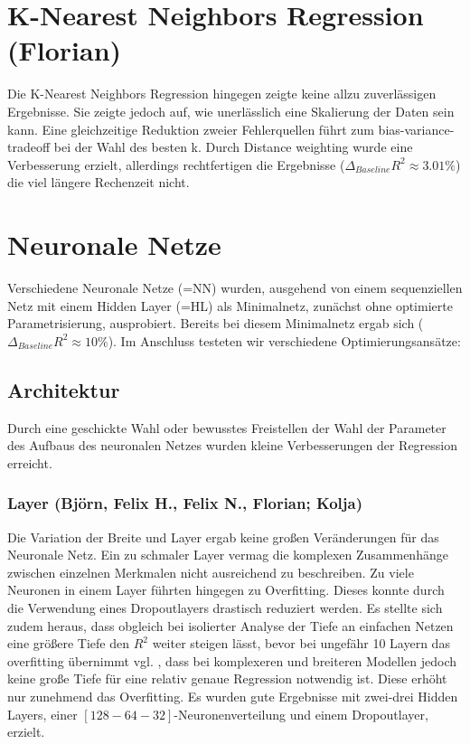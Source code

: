 \documentclass[9pt,a4paper,twocolumn,twoside]{tau-class/tau}
\begin{document}
\section{K-Nearest Neighbors Regression (Florian)}
        Die K-Nearest Neighbors Regression hingegen zeigte keine allzu zuverlässigen Ergebnisse. Sie zeigte jedoch auf,
        wie unerlässlich eine Skalierung der Daten sein kann. Eine gleichzeitige Reduktion zweier Fehlerquellen führt zum bias-variance-tradeoff bei der Wahl
        des besten k. Durch Distance weighting wurde eine Verbesserung erzielt, allerdings rechtfertigen die Ergebnisse ($\Delta_{Baseline} R^2 \approx 3.01\%$)
        die viel längere Rechenzeit nicht.


\section{Neuronale Netze}
        Verschiedene Neuronale Netze (=NN) wurden, ausgehend von einem sequenziellen Netz mit einem Hidden Layer (=HL) als Minimalnetz,
        zunächst ohne optimierte Parametrisierung, ausprobiert. Bereits bei diesem Minimalnetz ergab sich ($\Delta_{Baseline} R^2 \approx 10\%$).
        Im Anschluss testeten wir verschiedene Optimierungsansätze: 
        \subsection{Architektur}
        Durch eine geschickte Wahl oder bewusstes Freistellen der Wahl der Parameter des Aufbaus des neuronalen Netzes wurden kleine Verbesserungen
        der Regression erreicht.
            \subsubsection{Layer (Björn, Felix H., Felix N., Florian; Kolja)}
            Die Variation der Breite und Layer ergab keine großen Veränderungen für das Neuronale Netz. Ein zu schmaler Layer vermag die
            komplexen Zusammenhänge zwischen einzelnen Merkmalen nicht ausreichend zu beschreiben. Zu viele Neuronen in einem Layer
            führten hingegen zu Overfitting. 
            Dieses konnte durch die Verwendung eines Dropoutlayers drastisch reduziert werden.
            Es stellte sich zudem heraus, dass obgleich bei isolierter Analyse der Tiefe an einfachen Netzen eine größere Tiefe den $R^2$ weiter steigen lässt,
            bevor bei ungefähr 10 Layern das overfitting übernimmt vgl. ,
            dass bei komplexeren und breiteren Modellen jedoch keine große Tiefe für eine relativ genaue Regression notwendig ist.
            Diese erhöht nur zunehmend das Overfitting. Es wurden gute Ergebnisse mit zwei-drei Hidden Layers, einer $[128-64-32]$-Neuronenverteilung
            und einem Dropoutlayer, erzielt.
\end{document}
